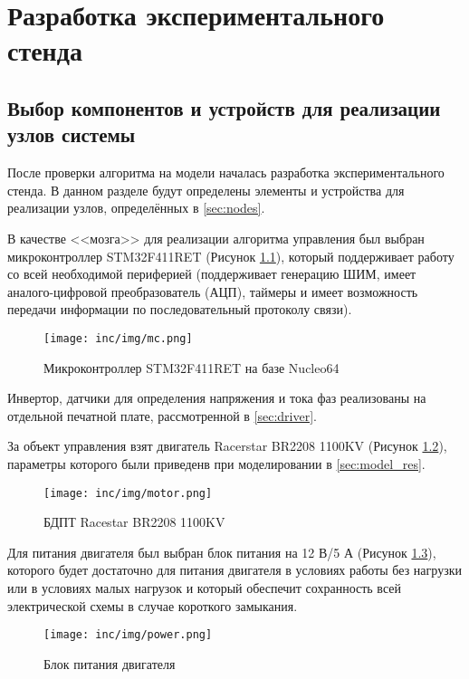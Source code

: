 \chapter{Разработка экспериментального стенда}
\label{cha:chap5}

\section{Выбор компонентов и устройств для реализации узлов системы}
\label{sec:choose}

После проверки алгоритма на модели началась разработка экспериментального стенда. В данном разделе будут определены элементы и устройства для реализации узлов, определённых в \ref{sec:nodes}.

В качестве <<мозга>> для реализации алгоритма управления был выбран микроконтроллер STM32F411RET (Рисунок \ref{pic:mc}), который поддерживает работу со всей необходимой периферией  (поддерживает генерацию ШИМ, имеет аналого-цифровой преобразователь (АЦП), таймеры и имеет возможность передачи информации по последовательный протоколу связи).

\begin{figure}[!h]
\centering
\texttt{[image: inc/img/mc.png]}
\caption{Микроконтроллер STM32F411RET на базе Nucleo64}
\label{pic:mc}
\end{figure}

Инвертор, датчики для определения напряжения и тока фаз реализованы на отдельной печатной плате, рассмотренной в \ref{sec:driver}. 

За объект управления взят двигатель Racerstar BR2208 1100KV (Рисунок \ref{pic:motor}), параметры которого были приведенв при моделировании в \ref{sec:model_res}.

\begin{figure}[!h]
\centering
\texttt{[image: inc/img/motor.png]}
\caption{БДПТ Racestar BR2208 1100KV}
\label{pic:motor}
\end{figure}

Для питания двигателя был выбран блок питания на 12 В/5 А (Рисунок \ref{pic:power}), которого будет достаточно для питания двигателя в условиях работы без нагрузки или в условиях малых нагрузок и который обеспечит сохранность всей электрической схемы в случае короткого замыкания.

\begin{figure}[!h]
\centering
\texttt{[image: inc/img/power.png]}
\caption{Блок питания двигателя}
\label{pic:power}
\end{figure}
\clearpage

